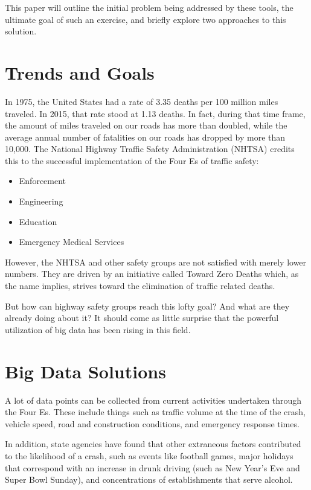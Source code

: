 \documentclass[sigconf]{acmart}
\begin{document}
This paper will outline the initial problem being addressed by these tools, the ultimate goal of such an exercise, and briefly explore two approaches to this solution. 

\section{Trends and Goals}
In 1975, the United States had a rate of 3.35 deaths per 100 million miles traveled.\cite{iihs} In 2015, that rate stood at 1.13 deaths. In fact, during that time frame, the amount of miles traveled on our roads has more than doubled, while the average annual number of fatalities on our roads has dropped by more than 10,000. The National Highway Traffic Safety Administration (NHTSA) credits this to the successful implementation of the Four Es of traffic safety:
\begin{itemize}
    \item Enforcement
    \item Engineering
    \item Education
    \item Emergency Medical Services \cite{gcn}
\end{itemize}
However, the NHTSA and other safety groups are not satisfied with merely lower numbers. They are driven by an initiative called Toward Zero Deaths which, as the name implies, strives toward the elimination of traffic related deaths.\cite{gcn} 

But how can highway safety groups reach this lofty goal? And what are they already doing about it? It should come as little surprise that the powerful utilization of big data has been rising in this field.

\section{Big Data Solutions}
A lot of data points can be collected from current activities undertaken through the Four Es. These include things such as traffic volume at the time of the crash, vehicle speed, road and construction conditions, and emergency response times. \cite{gcn}

In addition, state agencies have found that other extraneous factors contributed to the likelihood of a crash, such as events like football games, major holidays that correspond with an increase in drunk driving (such as New Year's Eve and Super Bowl Sunday), and concentrations of establishments that serve alcohol.\cite{pew} 
\end{document}
